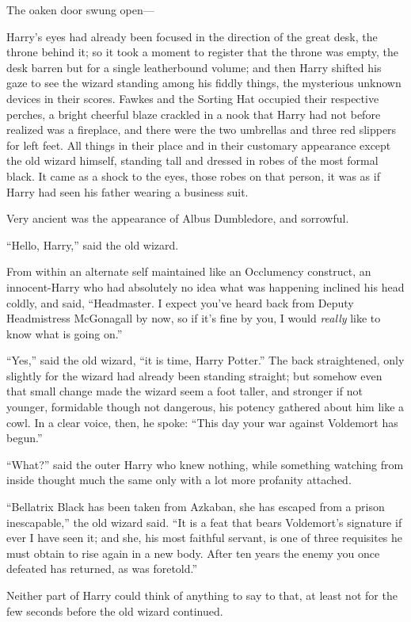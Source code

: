 The oaken door swung open—

Harry’s eyes had already been focused in the direction of the great desk, the
throne behind it; so it took a moment to register that the throne was empty,
the desk barren but for a single leatherbound volume; and then Harry shifted
his gaze to see the wizard standing among his fiddly things, the mysterious
unknown devices in their scores. Fawkes and the Sorting Hat occupied their
respective perches, a bright cheerful blaze crackled in a nook that Harry had
not before realized was a fireplace, and there were the two umbrellas and three
red slippers for left feet. All things in their place and in their customary
appearance except the old wizard himself, standing tall and dressed in robes of
the most formal black. It came as a shock to the eyes, those robes on that
person, it was as if Harry had seen his father wearing a business suit.

Very ancient was the appearance of Albus Dumbledore, and sorrowful.

“Hello, Harry,” said the old wizard.

From within an alternate self maintained like an Occlumency construct, an
innocent-Harry who had absolutely no idea what was happening inclined his head
coldly, and said, “Headmaster. I expect you’ve heard back from Deputy
Headmistress McGonagall by now, so if it’s fine by you, I would \emph{really}
like to know what is going on.”

“Yes,” said the old wizard, “it is time, Harry Potter.” The back straightened,
only slightly for the wizard had already been standing straight; but somehow
even that small change made the wizard seem a foot taller, and stronger if not
younger, formidable though not dangerous, his potency gathered about him like a
cowl. In a clear voice, then, he spoke: “This day your war against Voldemort
has begun.”

“What?” said the outer Harry who knew nothing, while something watching from
inside thought much the same only with a lot more profanity attached.

“Bellatrix Black has been taken from Azkaban, she has escaped from a prison
inescapable,” the old wizard said. “It is a feat that bears Voldemort’s
signature if ever I have seen it; and she, his most faithful servant, is one of
three requisites he must obtain to rise again in a new body. After ten years
the enemy you once defeated has returned, as was foretold.”

Neither part of Harry could think of anything to say to that, at least not for
the few seconds before the old wizard continued.

